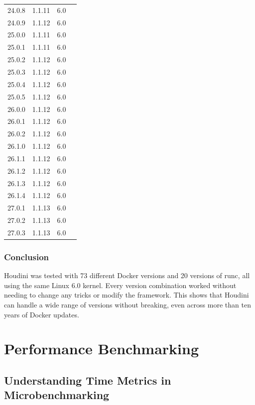\documentclass[12pt]{report}
\newcommand{\cmark}{\ding{51}} \newcommand{\xmark}{\ding{55}} \newcommand{\etal}{et~al.\ }
\begin{document}
\begin{doublespace}
{\begin{longtable}{|p{4cm}|p{3cm}||p{3cm}|p{2cm}|}
24.0.8 & 1.1.11 & 6.0 & \cmark \\
24.0.9 & 1.1.12 & 6.0 & \cmark \\
25.0.0 & 1.1.11 & 6.0 & \cmark \\
25.0.1 & 1.1.11 & 6.0 & \cmark \\
25.0.2 & 1.1.12 & 6.0 & \cmark \\
25.0.3 & 1.1.12 & 6.0 & \cmark \\
25.0.4 & 1.1.12 & 6.0 & \cmark \\
25.0.5 & 1.1.12 & 6.0 & \cmark \\
26.0.0 & 1.1.12 & 6.0 & \cmark \\
26.0.1 & 1.1.12 & 6.0 & \cmark \\
26.0.2 & 1.1.12 & 6.0 & \cmark \\
26.1.0 & 1.1.12 & 6.0 & \cmark \\
26.1.1 & 1.1.12 & 6.0 & \cmark \\
26.1.2 & 1.1.12 & 6.0 & \cmark \\
26.1.3 & 1.1.12 & 6.0 & \cmark \\
26.1.4 & 1.1.12 & 6.0 & \cmark \\
27.0.1 & 1.1.13 & 6.0 & \cmark \\
27.0.2 & 1.1.13 & 6.0 & \cmark \\
27.0.3 & 1.1.13 & 6.0 & \cmark \\
\end{longtable}
}

\subsubsection{Conclusion}

Houdini was tested with 73 different Docker versions and 20 versions of runc, all using the same Linux 6.0 kernel. Every version combination worked without needing to change any tricks or modify the framework. This shows that Houdini can handle a wide range of versions without breaking, even across more than ten years of Docker updates.




\section{Performance Benchmarking}

\subsection{Understanding Time Metrics in Microbenchmarking}


\end{doublespace}
\end{document}
